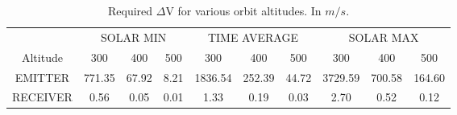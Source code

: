 \begin{table}
\centering
\begin{tabular}{ c | c | c | c | c | c | c | c | c | c }
& \multicolumn{3}{|c|}{SOLAR MIN}&\multicolumn{3}{|c|}{TIME AVERAGE}&\multicolumn{3}{|c}{SOLAR MAX} \\ \cline{2-10}
Altitude & 300 & 400 & 500 & 300 & 400 & 500 & 300 & 400 & 500 \\ \hline \hline
EMITTER & 771.35 & 67.92 & 8.21 & 1836.54 & 252.39 & 44.72 & 3729.59 & 700.58 & 164.60 \\
RECEIVER& 0.56 & 0.05 & 0.01 & 1.33 & 0.19 & 0.03 & 2.70 & 0.52 & 0.12 \\
\end{tabular}
\caption{Required $\Delta$V for various orbit altitudes. In $m/s$.}
\label{table:deltaVTable}
\end{table}
